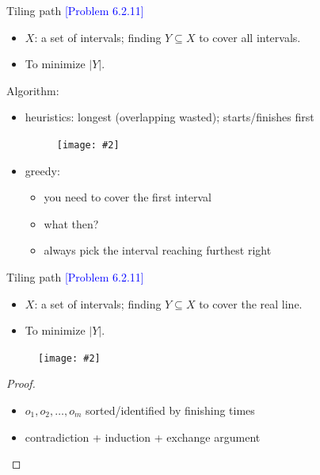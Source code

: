 \documentclass{beamer}
\newcommand{\problemno}[1]{\textcolor{blue}{\scriptsize [Problem #1]}}
\newcommand{\fignocaption}[2]
{
  \begin{figure}[htp]
    \centering
      \texttt{[image: \#2]}
  \end{figure}
}
\begin{document}
\begin{frame}{}
  \begin{block}{Tiling path \problemno{6.2.11}}
    \begin{itemize}
      \item $X$: a set of intervals; finding $Y \subseteq X$ to cover all
      intervals.
	  \item To minimize $|Y|$.
    \end{itemize}
  \end{block}

  \begin{block}{Algorithm:}
    \begin{itemize}
      \item heuristics: longest (overlapping wasted); starts/finishes
      first
      \fignocaption{width = 0.20\textwidth}{fig/tiling-path-example.pdf}
      \item greedy:
        \begin{itemize}
          \item you need to cover the first interval
          \item what then?
      	  \item always pick the interval reaching furthest right
        \end{itemize}
    \end{itemize}
  \end{block}
\end{frame}
\begin{frame}{}
  \begin{block}{Tiling path \problemno{6.2.11}}
    \begin{itemize}
      \item $X$: a set of intervals; finding $Y \subseteq X$ to cover the real
      line.
	  \item To minimize $|Y|$.
    \end{itemize}
  \end{block}

  \fignocaption{width = 0.50\textwidth}{fig/tiling-path.png}

  \begin{proof}
	\begin{itemize}
	  \item $o_1, o_2, \ldots, o_m$ sorted/identified by finishing times
	  \item contradiction + induction + exchange argument
	\end{itemize}
  \end{proof}
\end{frame}
\end{document}
